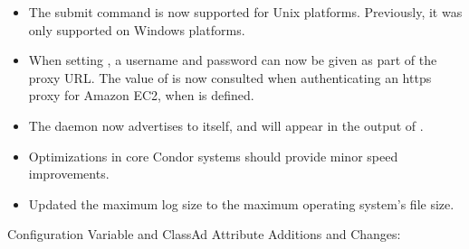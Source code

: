 \begin{itemize}
\item The submit command  is now supported
for Unix platforms. Previously, it was only supported on Windows platforms.

\item When setting , a username and password
can now be given as part of the proxy URL.
The value of  is now consulted when authenticating
an https proxy for Amazon EC2, when  is defined.

\item The  daemon now advertises to itself, and will appear
in the output of  .

\item Optimizations in core Condor systems should provide minor speed 
improvements.

\item Updated the maximum log size to the maximum operating system's file size.

\end{itemize}

\noindent Configuration Variable and ClassAd Attribute Additions and Changes:

